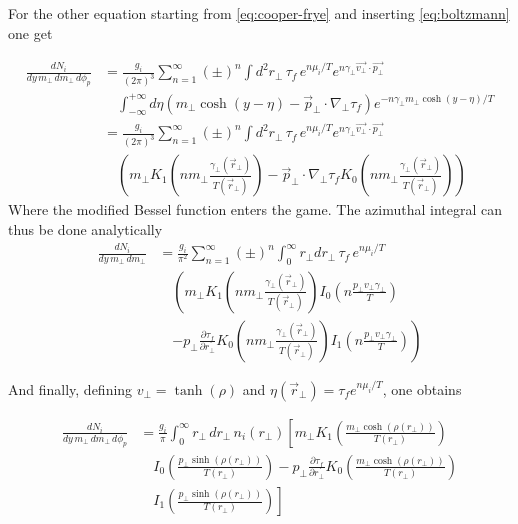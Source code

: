 \documentclass[12pt,a4paper]{book}
\begin{document}
	For the other equation starting from \ref{eq:cooper-frye} and inserting \ref{eq:boltzmann} one get
	
	\begin{equation}
		\begin{aligned}
			\frac{d N_i}{dy\, m_\perp\, dm_\perp\, d\phi_p} &= \frac{g_i}{(2\pi)^3} \sum_{n=1}^{\infty} (\pm)^n \int d^2 r_\perp \, \tau_f \, e^{n\mu_i/T} e^{n\gamma_\perp \vec{v_\perp} \cdot \vec{p_\perp}} \\
			& \quad \int_{-\infty}^{+\infty} d\eta \left(m_\perp \cosh(y-\eta) - \vec{p}_\perp \cdot \nabla_\perp \tau_f \right) e^{-n \gamma_\perp m_\perp \cosh(y-\eta)/T} \\
			&= \frac{g_i}{(2\pi)^3} \sum_{n=1}^{\infty} (\pm)^n \int d^2 r_\perp \, \tau_f \, e^{n\mu_i/T} e^{n\gamma_\perp \vec{v_\perp} \cdot \vec{p_\perp}} \\
			& \quad \left( m_\perp K_1\left(n m_\perp \frac{\gamma_\perp(\vec{r}_\perp)}{T(\vec{r}_\perp)}\right) - \vec{p}_\perp \cdot \nabla_\perp \tau_f K_0\left(n m_\perp \frac{\gamma_\perp(\vec{r}_\perp)}{T(\vec{r}_\perp)}\right) \right)
		\end{aligned}
	\end{equation}
	Where the modified Bessel function enters the game. The azimuthal integral can thus be done analytically
	\begin{equation}
		\begin{aligned}
			\frac{d N_i}{dy\, m_\perp\, dm_\perp} &= \frac{g_i}{\pi^2} \sum_{n=1}^{\infty} (\pm)^n \int_{0}^{\infty} r_\perp dr_\perp \, \tau_f \, e^{n\mu_i/T} \\
			& \quad \left( m_\perp K_1\left(n m_\perp \frac{\gamma_\perp(\vec{r}_\perp)}{T(\vec{r}_\perp)}\right) I_0\left(n \frac{p_\perp v_\perp \gamma_\perp}{T}\right) \right. \\
			& \quad \left. - p_\perp \frac{\partial \tau_f}{\partial r_\perp} K_0\left(n m_\perp \frac{\gamma_\perp(\vec{r}_\perp)}{T(\vec{r}_\perp)}\right) I_1\left(n \frac{p_\perp v_\perp \gamma_\perp}{T}\right) \right)
		\end{aligned}
	\end{equation}
	
	And finally, defining \( v_\perp = \tanh(\rho) \) and \( \eta(\vec{r}_\perp) = \tau_f e^{n \mu_i / T} \), one obtains
	
	\begin{equation}
		\begin{aligned}
			\frac{dN_i}{dy \, m_\perp \, dm_\perp \, d\phi_p} &= \frac{g_i}{\pi} \int_{0}^{\infty} r_\perp \, dr_\perp \, n_i(r_\perp) \left[ m_\perp K_1 \left( \frac{m_\perp \cosh(\rho(r_\perp))}{T(r_\perp)}\right) \right. \\
			& \quad \left. I_0 \left( \frac{p_\perp \sinh(\rho(r_\perp))}{T(r_\perp)} \right) - p_\perp \frac{\partial \tau_f}{\partial r_\perp} K_0 \left( \frac{m_\perp \cosh(\rho(r_\perp))}{T(r_\perp)}\right) \right. \\
			& \quad \left. I_1 \left( \frac{p_\perp \sinh(\rho(r_\perp))}{T(r_\perp)} \right) \right]
		\end{aligned}
		\label{eq:momentum_cooper-frye_a}
	\end{equation}
	
\end{document}
